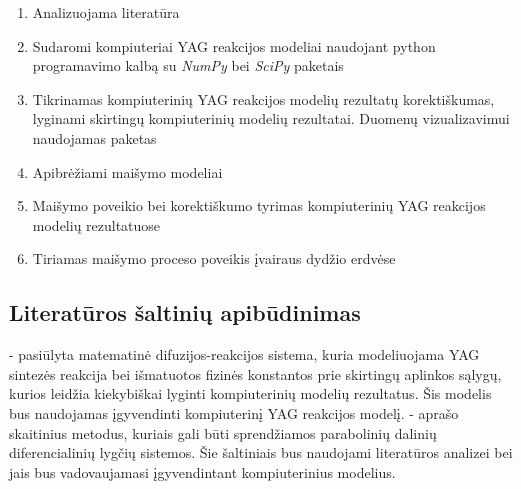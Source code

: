 \documentclass[]{VUMIFTemplateClass}
\begin{document}
\begin{enumerate}
    \item Analizuojama literatūra 
    \item Sudaromi kompiuteriai YAG reakcijos modeliai naudojant python programavimo kalbą su \textit{NumPy} bei \textit{SciPy} paketais
    \item Tikrinamas kompiuterinių YAG reakcijos modelių rezultatų korektiškumas, lyginami skirtingų kompiuterinių modelių rezultatai. Duomenų vizualizavimui naudojamas  paketas
    \item Apibrėžiami maišymo modeliai
    \item Maišymo poveikio bei korektiškumo tyrimas kompiuterinių YAG reakcijos modelių rezultatuose 
    \item Tiriamas maišymo proceso poveikis įvairaus dydžio erdvėse
\end{enumerate}

\subsection{Literatūros šaltinių apibūdinimas}

\cite{ivanauskasComputationalModellingYAG2009,ivanauskasModellingSolidState2005,mackeviciusCloserLookComputer2012} - pasiūlyta matematinė difuzijos-reakcijos sistema, kuria modeliuojama YAG sintezės reakcija bei išmatuotos fizinės konstantos prie skirtingų aplinkos sąlygų, kurios leidžia kiekybiškai lyginti kompiuterinių modelių rezultatus. Šis modelis bus naudojamas įgyvendinti kompiuterinį YAG reakcijos modelį. \cite{pressNumericalRecipes3rd2007,levequeFiniteDifferenceMethods2007} - aprašo skaitinius metodus, kuriais gali būti sprendžiamos parabolinių dalinių diferencialinių lygčių sistemos. Šie šaltiniais bus naudojami literatūros analizei bei jais bus vadovaujamasi įgyvendintant kompiuterinius modelius.

\printbibliography[title = {Literatūra ir šaltiniai}]
\end{document}
